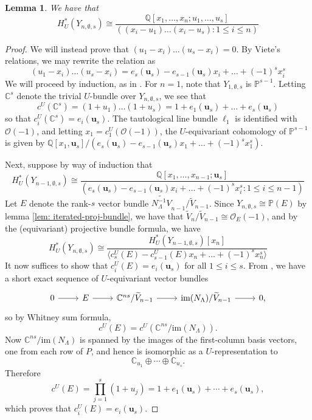 \documentclass[11pt]{amsart}
\numberwithin{equation}{section}
\newtheorem{lemma}[theorem]{Lemma}
\theoremstyle{definition}
\newcommand{\CC}{{\mathbb{C}}}
\newcommand{\QQ}{{\mathbb{Q}}}
\newcommand{\PP}{{\mathbb{P}}}
\newcommand{\uuu}{{\mathbf{u}}}
\newcommand{\im}{\text{im}}
\begin{document}
\begin{lemma}\label{lem: proj-bundle-cohom}
    We have that
    \[
H^*_U(Y_{n,\emptyset,s}) \cong \frac{\QQ[x_1,\dots,x_n;u_1,\dots,u_s]}{( (x_i-u_1)\dots(x_i-u_s) : 1 \leq i \leq n)}
\]
\end{lemma}

\begin{proof}
    We will instead prove that $(u_1-x_i)\dots(u_s-x_i) = 0$. By Viete's relations, we may rewrite the relation as
    \begin{equation}\label{eq: rel-family1-chern}
        (u_1-x_i)\dots(u_s-x_i) = e_s(\uuu_s) - e_{s-1}(\uuu_s)x_i + \dots + (-1)^s x_i^s
    \end{equation}
    We will proceed by induction, as in \cite{GLW}. For $n = 1$, note that $Y_{1,\emptyset,s}$ is $\PP^{s-1}$. Letting $\CC^s$ denote the trivial $U$-bundle over $Y_{n,\emptyset,s}$, we see that
    \[
c^U(\CC^{s}) = (1+u_1)\dots ( 1 + u_s) = 1 + e_1(\uuu_s) + \dots + e_s(\uuu_s)
\]
    so that $c_i^U(\CC^s) = e_i(\uuu_s)$. The tautological line bundle $\ell_1$ is identified with $\mathcal{O}(-1)$, and letting $x_1 = c_1^U(\mathcal{O}(-1))$, the $U$-equivariant cohomology of $\PP^{s-1}$ is given by $\QQ[x_1,\uuu_s]/(e_s(\uuu_s) - e_{s-1}(\uuu_s)x_1 + \dots + (-1)^s x_1^s)$. 

    Next, suppose by way of induction that 
    \[
H^*_U(Y_{n-1,\emptyset,s}) \cong \frac{\QQ[x_1,\dots,x_{n-1};\uuu_s]}{( e_s(\uuu_s) - e_{s-1}(\uuu_s)x_i + \dots + (-1)^s x_i^s : 1 \leq i \leq n-1)}
\]
    Let $E$ denote the rank-$s$ vector bundle $\widetilde{N_\Lambda^{-1}V}_{n-1}/\widetilde{V}_{n-1}$. Since $Y_{n,\emptyset,s} \cong \PP(E)$ by lemma \ref{lem: iterated-proj-bundle}, we have that $\widetilde{V}_n/\widetilde{V}_{n-1} \cong \mathcal{O}_E(-1)$, and by the (equivariant) projective bundle formula, we have
    \[
H^*_U(Y_{n,\emptyset,s}) \cong \frac{H^*_U(Y_{n-1,\emptyset,s})[x_n]}{\langle c_s^U(E) - c_{s-1}^U(E)x_n + \dots + (-1)^sx_n^s \rangle }
\]
    It now suffices to show that $c_i^U(E)=e_i(\uuu_s)$ for all $1\leq i\leq s$.
From \cite{GLW}, we have a short exact sequence of $U$-equivariant vector
bundles
\[
\begin{tikzcd}
0 \arrow[r] & E \arrow[r] & \CC^{ns}/\widetilde{V}_{n-1}
\arrow[r] & \im(N_\Lambda)/\widetilde{V}_{n-1} \arrow[r] & 0,
\end{tikzcd}
\]
so by Whitney sum formula,
\[
c^U(E)=c^U(\CC^{ns}/\im(N_\Lambda)).
\]
Now $\CC^{ns}/\im(N_\Lambda)$ is spanned by the images of the first-column basis
vectors, one from each row of $P$, and hence is isomorphic as a
$U$-representation to
\[
\CC_{u_1}\oplus \cdots \oplus \CC_{u_s}.
\]
Therefore
\[
c^U(E)=\prod_{j=1}^s (1+u_j)=1+e_1(\uuu_s)+\cdots+e_s(\uuu_s),
\]
which proves that $c_i^U(E)=e_i(\uuu_s)$.

\end{proof}
\end{document}
